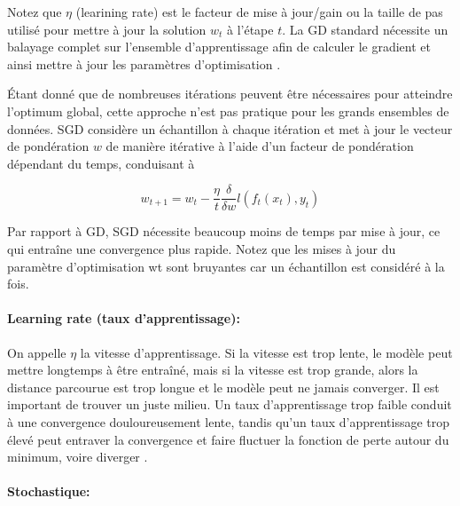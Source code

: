 	
	
	Notez que $\eta$ (learining rate) est le facteur de mise à jour/gain ou la taille de pas utilisé pour mettre à jour la solution $w_t$ à l'étape $t$. La GD standard nécessite un balayage complet sur l'ensemble d'apprentissage afin de calculer le gradient et ainsi mettre à jour les paramètres d'optimisation \cite{wijnhoven2010fast}.
	
	Étant donné que de nombreuses itérations peuvent être nécessaires pour atteindre l'optimum global, cette approche n'est pas pratique pour les grands ensembles de données. SGD considère un échantillon à chaque itération et met à jour le vecteur de pondération $w$ de manière itérative à l'aide d'un facteur de pondération dépendant du temps, conduisant à 
	
	\begin{equation*}
		{\displaystyle w_{t+1} = w_t -  \frac{\eta}{t}  {\frac {\delta }{\delta w} l(f_t(x_t),y_t)}}
	\end{equation*}
	
	Par rapport à GD, SGD nécessite beaucoup moins de temps par mise à jour, ce qui entraîne une convergence plus rapide. Notez que les mises à jour du paramètre d'optimisation wt sont bruyantes car un échantillon est considéré à la fois.
	
	\paragraph*{Learning rate (taux d’apprentissage):}On appelle $\eta$ la vitesse d’apprentissage.
	Si la vitesse est trop lente, le modèle peut mettre longtemps à être entraîné, mais si la vitesse est trop grande, alors la distance parcourue est trop longue et le modèle peut ne jamais converger. Il est important de trouver un juste milieu. 
	Un taux d'apprentissage trop faible conduit à une convergence douloureusement lente, tandis qu'un taux d'apprentissage trop élevé peut entraver la convergence et faire fluctuer la fonction de perte autour du minimum, voire diverger \cite{ruder2016overview}.
	
	
	\paragraph{Stochastique:}
	
